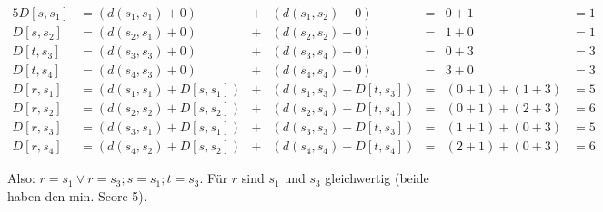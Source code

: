 \documentclass[a4paper,10pt,oneside,leqno]{scrartcl}
\begin{document}
\begin{alignat}{5}
 D[s, s_1] &= (d(s_1,s_1)+0) &+{}& (d(s_1,s_2)+0) &=& 0 + 1 &= 1\\
 D[s, s_2] &= (d(s_2,s_1)+0) &+{}& (d(s_2,s_2)+0) &=& 1 + 0 &= 1\\\hline 
 D[t, s_3] &= (d(s_3,s_3)+0) &+{}& (d(s_3,s_4)+0) &=& 0 + 3 &= 3\\
 D[t, s_4] &= (d(s_4,s_3)+0) &+{}& (d(s_4,s_4)+0) &=& 3 + 0 &= 3\\\hline
 D[r, s_1] &= (d(s_1,s_1)+D[s, s_1]) &+{}& (d(s_1,s_3)+D[t, s_3]) &=& (0+1) + (1+3) &= 5\\
 D[r, s_2] &= (d(s_2,s_2)+D[s, s_2]) &+{}& (d(s_2,s_4)+D[t, s_4]) &=& (0+1) + (2+3) &= 6\\
 D[r, s_3] &= (d(s_3,s_1)+D[s, s_1]) &+{}& (d(s_3,s_3)+D[t, s_3]) &=& (1+1) + (0+3) &= 5\\
 D[r, s_4] &= (d(s_4,s_2)+D[s, s_2]) &+{}& (d(s_4,s_4)+D[t, s_4]) &=& (2+1) + (0+3) &= 6
\end{alignat}

Also: $r = s_1 \vee r = s_3 ; s = s_1 ; t = s_3$. Für $r$ sind $s_1$ und $s_3$ gleichwertig (beide haben den min. Score 5).
\end{document}
